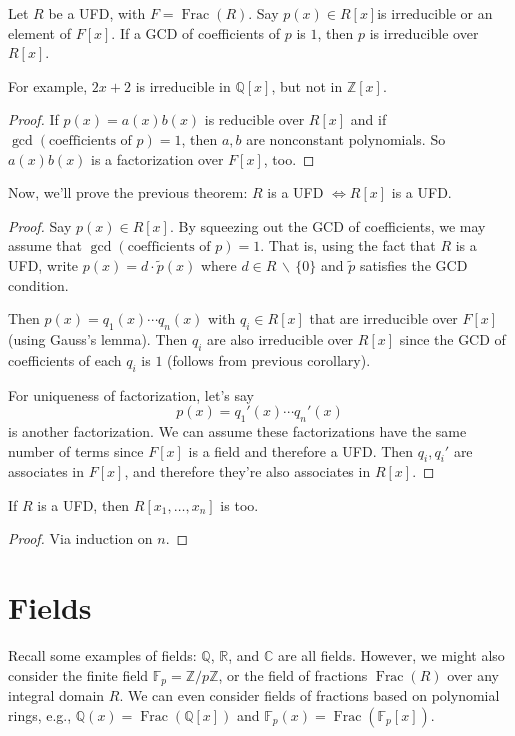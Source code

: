 \documentclass{article}
\theoremstyle{plain}
\newcommand{\Q}{\mathbb{Q}}
\newcommand{\R}{\mathbb{R}}
\newcommand{\C}{\mathbb{C}}
\newcommand{\Z}{\mathbb{Z}}
\newcommand{\on}[1]{\operatorname{#1}}
\begin{document}
\begin{corollary}{}{}
Let $R$ be a UFD, with $F = \on{Frac}(R)$. Say $p(x) \in R[x]$is irreducible or an element of $F[x]$. If a GCD of coefficients of $p$ is $1$, then $p$ is irreducible over $R[x]$.
\end{corollary}
For example, $2x + 2$ is irreducible in $\Q[x]$, but not in $\Z[x]$.
\begin{proof}
If $p(x) = a(x)b(x)$ is reducible over $R[x]$ and if $\gcd(\text{coefficients of $p$}) = 1$, then $a,b$ are nonconstant polynomials. So $a(x)b(x)$ is a factorization over $F[x]$, too.
\end{proof}
Now, we'll prove the previous theorem: $R$ is a UFD $\iff R[x]$ is a UFD.
\begin{proof}
	Say $p(x) \in R[x]$. By squeezing out the GCD of coefficients, we may assume that $\gcd(\text{coefficients of $p$}) = 1$. That is, using the fact that $R$ is a UFD, write $p(x) = d\cdot \widetilde{p}(x)$ where $d \in R \,\backslash\,\{0\}$ and $\widetilde{p}$ satisfies the GCD condition.
	
	Then $p(x) = q_1(x)\cdots q_n(x)$ with $q_i \in R[x]$ that are irreducible over $F[x]$ (using Gauss's lemma). Then $q_i$ are also irreducible over $R[x]$ since the GCD of coefficients of each $q_i$ is $1$ (follows from previous corollary).
	
	For uniqueness of factorization, let's say
	$$p(x) = q_1'(x) \cdots q_n'(x)$$ is another factorization. We can assume these factorizations have the same number of terms since $F[x]$ is a field and therefore a UFD. Then $q_i,q_i'$ are associates in $F[x]$, and therefore they're also associates in $R[x]$.
\end{proof}

\begin{corollary}{}{}
If $R$ is a UFD, then $R[x_1,\ldots,x_n]$ is too.
\end{corollary}
\begin{proof}
Via induction on $n$.	
\end{proof}

\section{Fields}
Recall some examples of fields: $\Q$, $\R$, and $\C$ are all fields. However, we might also consider the finite field $\mathbb{F}_p = \Z/p\Z$, or the field of fractions $\on{Frac}(R)$ over any integral domain $R$. We can even consider fields of fractions based on polynomial rings, e.g., $\Q(x) = \on{Frac}(\Q[x])$ and $\mathbb{F}_p(x) = \on{Frac}(\mathbb{F}_p[x])$.
\end{document}
